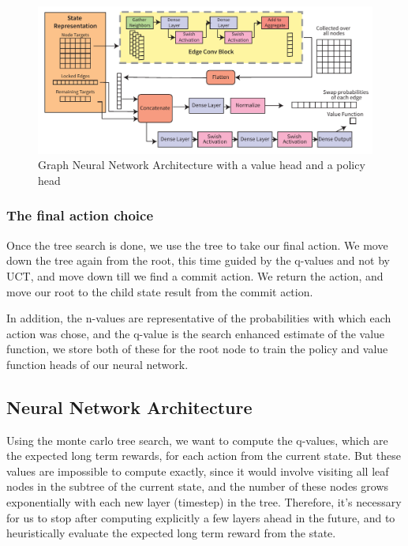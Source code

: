 \documentclass[%
 reprint,
 longbibliography,
 amsmath,amssymb,
 aps,
]{revtex4-2}
\begin{document}
\begin{figure}[ht]
    \includegraphics[width=\textwidth]{images/Architecture.pdf}
    \caption{\label{fig:network-architecture}
        Graph Neural Network Architecture with a value head and a policy head}
\end{figure}

\subsubsection{The final action choice}

Once the tree search is done, we use the tree to take our final action. We move down the tree again from the root, this time guided by the q-values and not by UCT, and move down till we find a commit action. We return the action, and move our root to the child state result from the commit action.

In addition, the n-values are representative of the probabilities with which each action was chose, and the q-value is the search enhanced estimate of the value function, we store both of these for the root node to train the policy and value function heads of our neural network.

\subsection{\label{sec:method-model}Neural Network Architecture}

Using the monte carlo tree search, we want to compute the q-values, which are the expected long term rewards, for each action from the current state. But these values are impossible to compute exactly, since it would involve visiting all leaf nodes in the subtree of the current state, and the number of these nodes grows exponentially with each new layer (timestep) in the tree. Therefore, it's necessary for us to stop after computing explicitly a few layers ahead in the future, and to heuristically evaluate the expected long term reward from the state.
\end{document}

